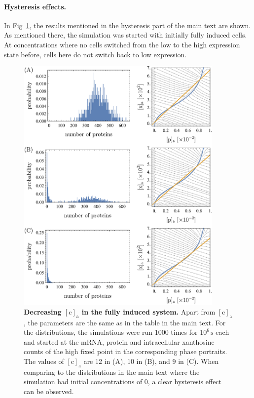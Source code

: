 \documentclass[10pt,letterpaper]{article}
\newcommand{\unit}[1]{\,\mathrm{#1}}
\newcommand{\n}[1]{\mathrm{#1}}
\begin{document}
\paragraph*{Hysteresis effects.}
In Fig~\ref{figS8:hysteresis}, the results mentioned in the hysteresis part
of the main text are shown. As mentioned there,  the simulation was started
with initially fully induced cells. At concentrations where no cells
switched from the low to the high expression state before, cells here do not
switch back to low expression.

\begin{figure}
	\centering
	\includegraphics[width=0.9\textwidth]{FigSI8.pdf}
	\caption{{\bf Decreasing $\n{[c]_a}$ in the fully induced system.}
		Apart from $\n{[c]_a}$, the parameters are the same as in the table
		in the main text. For the distributions, the simulations were run
		1000 times for $10^6 \unit{s}$ each and started at the mRNA, protein
		and intracellular xanthosine counts of the high fixed point in the
		corresponding phase portraits. The values of $\n{[c]_a}$ are 12 in
		(A), 10 in (B), and 9 in (C). When comparing to the distributions in
		the main text where the simulation had initial concentrations of 0,
		a clear hysteresis effect can be observed.}
	\label{figS8:hysteresis}
\end{figure}
\end{document}
